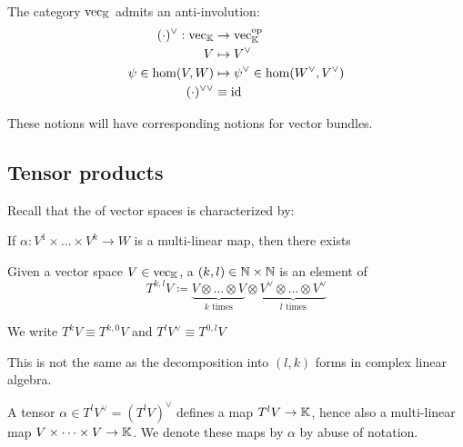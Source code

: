 The category \(\text{vec}_{\mathbb{K}}\) admits an anti-involution:
\begin{align*}
    (\cdot)^{\vee}:\text{vec}_{\mathbb{K}}&\to \text{vec}_{\mathbb{K}}^{\text{op}}\\
    V&\mapsto V^\vee \\
    \psi\in\text{hom}(V,W)&\mapsto \psi^\vee \in \text{hom}(W^\vee,V^\vee) \\
    (\cdot)^{\vee\vee} & \equiv \text{id}
\end{align*}

These notions will have corresponding notions for vector bundles.

\subsection{Tensor products}

Recall that the  of vector spaces is characterized by:

 If \(\alpha:V^1\times \dots\times V^k\to W\) is a 
multi-linear map, then there exists 
\begin{center}
\end{center}

\begin{definition*}
    Given a vector space \(V\in \text{vec}_{\mathbb{K}}\), a  
    \((k,l)\in \mathbb{N}\times \mathbb{N}\) is an element of 
    \[T^{k,l}V\coloneqq \underbrace{V\otimes \dots \otimes V}_{k\text{ times}}\otimes \underbrace{V^\vee\otimes \dots \otimes V^\vee}_{l\text{ times}}\]   
\end{definition*}

We write \(T^kV\equiv T^{k,0}V\) and \(T^lV^\vee\equiv T^{0,l}V\)

\begin{remark}
    This is not the same as the decomposition into \((l,k)\) forms in complex linear algebra. 
\end{remark}

A tensor \(\alpha\in T^lV^\vee=(T^l V)^\vee\) defines a map \(T^lV\to \mathbb{K}\), hence also 
a multi-linear map \(V\times \dots\times V\to \mathbb{K}\). We denote these maps by \(\alpha\) by abuse of notation.

